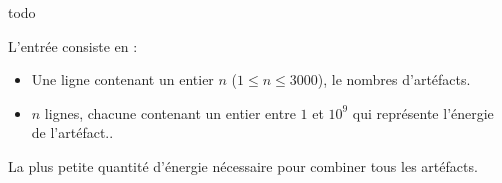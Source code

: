 \problemname{\problemyamlname{}}


todo

\begin{Input}
    L'entrée consiste en :
    \begin{itemize}
        \item Une ligne contenant un entier $n$ ($1 \leq n \leq 3000$), le nombres d'artéfacts.
        \item $n$ lignes, chacune contenant un entier entre $1$ et $10^{9}$ qui représente l'énergie de l'artéfact..
    \end{itemize}
\end{Input}

\begin{Output}
    La plus petite quantité d'énergie nécessaire pour combiner tous les artéfacts.
\end{Output}
